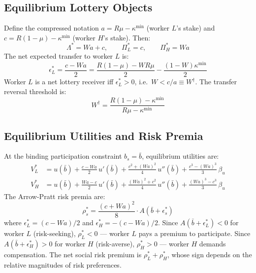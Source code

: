 \documentclass[12pt,a4paper]{article}
\begin{document}
\subsection{Equilibrium Lottery Objects}

Define the compressed notation $a = R\mu - \kappa^{\min}$ (worker $L$'s stake)
and $c = R(1-\mu) - \kappa^{\min}$ (worker $H$'s stake). Then:
\begin{equation}
  \Lambda^* = Wa + c, \qquad
  \Pi_L^* = c, \qquad
  \Pi_H^* = Wa
  \label{eq:pool_compact}
\end{equation}
The net expected transfer to worker $L$ is:
\begin{equation}
  \epsilon_L^* = \frac{c - Wa}{2}
  = \frac{R(1-\mu) - WR\mu}{2} - \frac{(1-W)\kappa^{\min}}{2}
  \label{eq:transfer}
\end{equation}
Worker $L$ is a net lottery receiver iff $\epsilon_L^* > 0$,
i.e.\ $W < c/a \equiv W^\dagger$. The transfer reversal threshold is:
\begin{equation}
  W^\dagger = \frac{R(1-\mu) - \kappa^{\min}}{R\mu - \kappa^{\min}}
\end{equation}

\subsection{Equilibrium Utilities and Risk Premia}

At the binding participation constraint $b_s = \bar{b}$, equilibrium
utilities are:
\begin{align}
  V_L^* &= u(\bar{b}) + \frac{c-Wa}{2}\,u'(\bar{b})
           + \frac{c^2+(Wa)^2}{4}\,u''(\bar{b})
           + \frac{c^3-(Wa)^3}{3}\,\beta_u
  \label{eq:VL} \\
  V_H^* &= u(\bar{b}) + \frac{Wa-c}{2}\,u'(\bar{b})
           + \frac{(Wa)^2+c^2}{4}\,u''(\bar{b})
           + \frac{(Wa)^3-c^3}{3}\,\beta_u
  \label{eq:VH}
\end{align}
The Arrow-Pratt risk premia are:
\begin{equation}
  \rho_s^* = \frac{(c+Wa)^2}{8}\cdot A\!\left(\bar{b}+\epsilon_s^*\right)
  \label{eq:rho}
\end{equation}
where $\epsilon_L^* = (c-Wa)/2$ and $\epsilon_H^* = -(c-Wa)/2$.
Since $A(\bar{b}+\epsilon_L^*) < 0$ for worker $L$ (risk-seeking),
$\rho_L^* < 0$ — worker $L$ pays a premium to participate.
Since $A(\bar{b}+\epsilon_H^*) > 0$ for worker $H$ (risk-averse),
$\rho_H^* > 0$ — worker $H$ demands compensation.
The net social risk premium is $\rho_L^* + \rho_H^*$, whose sign
depends on the relative magnitudes of risk preferences.
\end{document}
